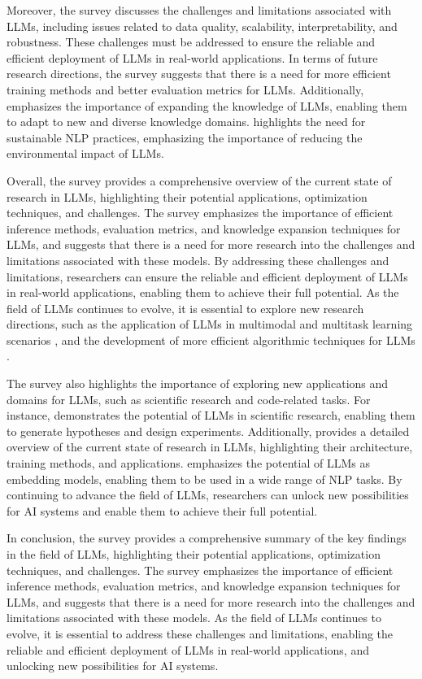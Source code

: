 \documentclass[11pt]{article}
\begin{document}
Moreover, the survey discusses the challenges and limitations associated with LLMs, including issues related to data quality, scalability, interpretability, and robustness. These challenges must be addressed to ensure the reliable and efficient deployment of LLMs in real-world applications. In terms of future research directions, the survey suggests that there is a need for more efficient training methods and better evaluation metrics for LLMs. Additionally, \cite{ref4} emphasizes the importance of expanding the knowledge of LLMs, enabling them to adapt to new and diverse knowledge domains. \cite{ref353} highlights the need for sustainable NLP practices, emphasizing the importance of reducing the environmental impact of LLMs.

Overall, the survey provides a comprehensive overview of the current state of research in LLMs, highlighting their potential applications, optimization techniques, and challenges. The survey emphasizes the importance of efficient inference methods, evaluation metrics, and knowledge expansion techniques for LLMs, and suggests that there is a need for more research into the challenges and limitations associated with these models. By addressing these challenges and limitations, researchers can ensure the reliable and efficient deployment of LLMs in real-world applications, enabling them to achieve their full potential. As the field of LLMs continues to evolve, it is essential to explore new research directions, such as the application of LLMs in multimodal and multitask learning scenarios \cite{ref8}, and the development of more efficient algorithmic techniques for LLMs \cite{ref354}.

The survey also highlights the importance of exploring new applications and domains for LLMs, such as scientific research and code-related tasks. For instance, \cite{ref355} demonstrates the potential of LLMs in scientific research, enabling them to generate hypotheses and design experiments. Additionally, \cite{ref1} provides a detailed overview of the current state of research in LLMs, highlighting their architecture, training methods, and applications. \cite{ref356} emphasizes the potential of LLMs as embedding models, enabling them to be used in a wide range of NLP tasks. By continuing to advance the field of LLMs, researchers can unlock new possibilities for AI systems and enable them to achieve their full potential.

In conclusion, the survey provides a comprehensive summary of the key findings in the field of LLMs, highlighting their potential applications, optimization techniques, and challenges. The survey emphasizes the importance of efficient inference methods, evaluation metrics, and knowledge expansion techniques for LLMs, and suggests that there is a need for more research into the challenges and limitations associated with these models. As the field of LLMs continues to evolve, it is essential to address these challenges and limitations, enabling the reliable and efficient deployment of LLMs in real-world applications, and unlocking new possibilities for AI systems.
\end{document}
